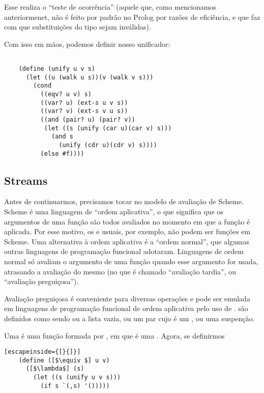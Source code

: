   Esse  realiza o ``teste de ocorrência'' (aquele
  que, como mencionamos anteriormenet, não é feito por padrão no
  Prolog por razões de eficiência, e que faz com que substituições do
  tipo  sejam inválidas).

  Com isso em mãos, podemos definir nosso unificador:

  \begin{lstlisting}

    (define (unify u v s)
      (let ((u (walk u s))(v (walk v s)))
        (cond
          ((eqv? u v) s)
          ((var? u) (ext-s u v s))
          ((var? v) (ext-s v u s))
          ((and (pair? u) (pair? v))
           (let ((s (unify (car u)(car v) s)))
             (and s
               (unify (cdr u)(cdr v) s))))
          (else #f))))

  \end{lstlisting}

  \subsection{Streams}

  Antes de continuarmos, precisamos tocar no modelo de avaliação de
  Scheme. Scheme é uma linguagem de ``ordem aplicativa'', o que
  significa que os argumentos de uma função são todos avaliados no
  momento em que a função é aplicada. Por esse motivo, os
   e  usuais, por exemplo, não podem ser
  funções em Scheme. Uma alternativa à ordem aplicativa é a ``ordem
  normal'', que algumas outras linguagens de programação funcional
  adotaram. Linguagens de ordem normal só avaliam o argumento de uma
  função quando esse argumento for usada, atrasando a avaliação do
  mesmo (no que é chamado ``avaliação tardia'', ou ``avaliação
  preguiçosa'').

  Avaliação preguiçosa é conveniente para diversas operações e pode
  ser emulada em linguagens de programação funcional de ordem
  aplicativa pelo uso de .  são
  definidos como sendo ou a lista vazia, ou um par cujo
   é um , ou uma suspenção.

  Uma  é uma função formada por , em que  é uma
  . Agora, se definirmos

  \begin{lstlisting}[escapeinside={[}{]}]
    (define ([$\equiv $] u v)
      ([$\lambda$] (s)
        (let ((s (unify u v s)))
          (if s `(,s) '()))))
  \end{lstlisting}
        
